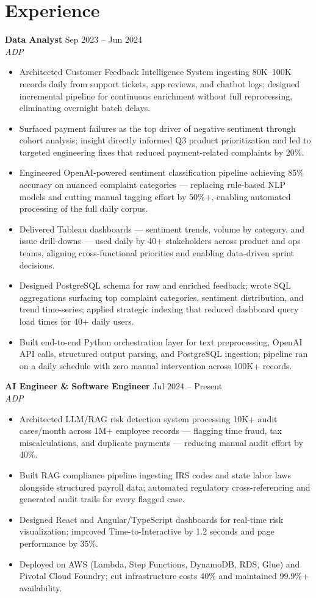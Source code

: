\documentclass[10pt,letterpaper]{article}
\newcommand{\entry}[3]{%
  \vspace{3pt}\textbf{#1} \hfill #3 \\
  \textit{\small #2}\vspace{1pt}}
\begin{document}
\section{Experience}

\entry{Data Analyst}{ADP}{Sep 2023 -- Jun 2024}
\begin{itemize}
  \item Architected Customer Feedback Intelligence System ingesting 80K--100K records daily from support tickets, app reviews, and chatbot logs; designed incremental pipeline for continuous enrichment without full reprocessing, eliminating overnight batch delays.
  \item Surfaced payment failures as the top driver of negative sentiment through cohort analysis; insight directly informed Q3 product prioritization and led to targeted engineering fixes that reduced payment-related complaints by 20\%.
  \item Engineered OpenAI-powered sentiment classification pipeline achieving 85\% accuracy on nuanced complaint categories --- replacing rule-based NLP models and cutting manual tagging effort by 50\%+, enabling automated processing of the full daily corpus.
  \item Delivered Tableau dashboards --- sentiment trends, volume by category, and issue drill-downs --- used daily by 40+ stakeholders across product and ops teams, aligning cross-functional priorities and enabling data-driven sprint decisions.
  \item Designed PostgreSQL schema for raw and enriched feedback; wrote SQL aggregations surfacing top complaint categories, sentiment distribution, and trend time-series; applied strategic indexing that reduced dashboard query load times for 40+ daily users.
  \item Built end-to-end Python orchestration layer for text preprocessing, OpenAI API calls, structured output parsing, and PostgreSQL ingestion; pipeline ran on a daily schedule with zero manual intervention across 100K+ records.
\end{itemize}

\entry{AI Engineer \& Software Engineer}{ADP}{Jul 2024 -- Present}
\begin{itemize}
  \item Architected LLM/RAG risk detection system processing 10K+ audit cases/month across 1M+ employee records --- flagging time fraud, tax miscalculations, and duplicate payments --- reducing manual audit effort by 40\%.
  \item Built RAG compliance pipeline ingesting IRS codes and state labor laws alongside structured payroll data; automated regulatory cross-referencing and generated audit trails for every flagged case.
  \item Designed React and Angular/TypeScript dashboards for real-time risk visualization; improved Time-to-Interactive by 1.2 seconds and page performance by 35\%.
  \item Deployed on AWS (Lambda, Step Functions, DynamoDB, RDS, Glue) and Pivotal Cloud Foundry; cut infrastructure costs 40\% and maintained 99.9\%+ availability.
\end{itemize}
\end{document}

